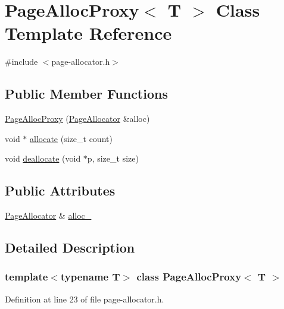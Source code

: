\hypertarget{class_page_alloc_proxy}{}\section{Page\+Alloc\+Proxy$<$ T $>$ Class Template Reference}
\label{class_page_alloc_proxy}


{\ttfamily \#include $<$page-\/allocator.\+h$>$}

\subsection*{Public Member Functions}
\begin{DoxyCompactItemize}
\item 
\mbox{\hyperlink{class_page_alloc_proxy_a87bd2d2c09dca3fb6e3d2dc64199624a}{Page\+Alloc\+Proxy}} (\mbox{\hyperlink{class_page_allocator}{Page\+Allocator}} \&alloc)
\item 
void $\ast$ \mbox{\hyperlink{class_page_alloc_proxy_a6eb35c0d191b75c7448c1dbe722f1241}{allocate}} (size\+\_\+t count)
\item 
void \mbox{\hyperlink{class_page_alloc_proxy_aae141951053a3d3a4288b9a8cd548514}{deallocate}} (void $\ast$p, size\+\_\+t size)
\end{DoxyCompactItemize}
\subsection*{Public Attributes}
\begin{DoxyCompactItemize}
\item 
\mbox{\hyperlink{class_page_allocator}{Page\+Allocator}} \& \mbox{\hyperlink{class_page_alloc_proxy_a7b5be1918abad6ffc2cc6f88b1dec98c}{alloc\+\_\+}}
\end{DoxyCompactItemize}


\subsection{Detailed Description}
\subsubsection*{template$<$typename T$>$\newline
class Page\+Alloc\+Proxy$<$ T $>$}



Definition at line 23 of file page-\/allocator.\+h.



